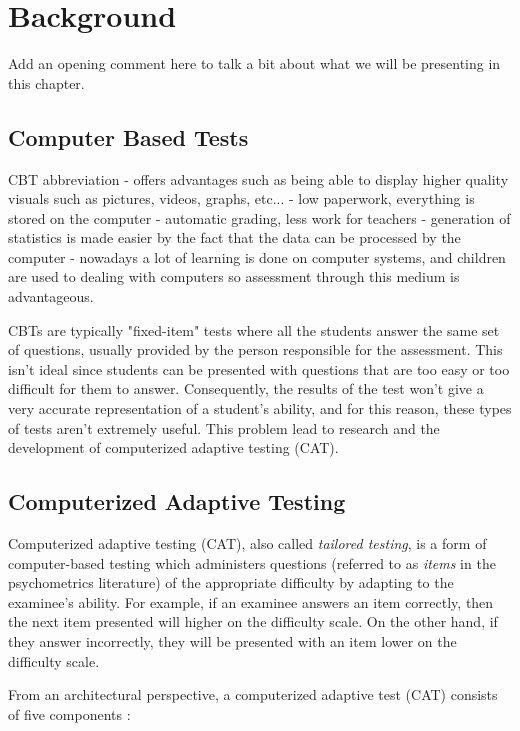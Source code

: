 \chapter{Background}
Add an opening comment here to talk a bit about what we will be presenting in this chapter.

\section{Computer Based Tests}
CBT abbreviation
- offers advantages such as being able to display higher quality visuals such as pictures, videos, graphs, etc...
- low paperwork, everything is stored on the computer
- automatic grading, less work for teachers
- generation of statistics is made easier by the fact that the data can be processed by the computer
- nowadays a lot of learning is done on computer systems, and children are used to dealing with computers so assessment through this medium is advantageous. \newline

CBTs are typically "fixed-item" tests where all the students answer the same set of questions,  usually provided by the person responsible for the assessment. This isn't ideal since students can be presented with questions that are too easy or too difficult for them to answer. Consequently, the results of the test won't give a very accurate representation of a student's ability, and for this reason, these types of tests aren't extremely useful. This problem lead to research and the development of computerized adaptive testing (CAT).

\section{Computerized Adaptive Testing}
\label{sec:CAT}
Computerized adaptive testing (CAT), also called \textit{tailored testing}, is a form of computer-based testing which administers questions (referred to as \textit{items} in the psychometrics literature) of the appropriate difficulty by adapting to the examinee's ability.
For example, if an examinee answers an item correctly, then the next item presented will higher on the difficulty scale. On the other hand, if they answer incorrectly, they will be presented with an item lower on the difficulty scale. \newline

From an architectural perspective, a computerized adaptive test (CAT) consists of five components \cite{CAT-Framework}:

